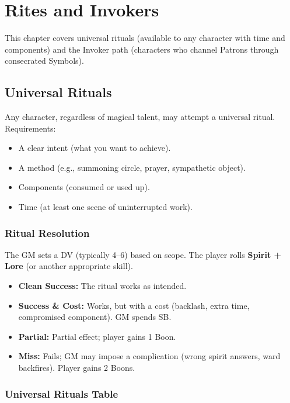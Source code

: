 
\section{Rites and Invokers}

This chapter covers universal rituals (available to any character with time and components) and the Invoker path (characters who channel Patrons through consecrated Symbols).

\subsection{Universal Rituals}

Any character, regardless of magical talent, may attempt a universal ritual. Requirements:

\begin{itemize}
  \item A clear intent (what you want to achieve).
  \item A method (e.g., summoning circle, prayer, sympathetic object).
  \item Components (consumed or used up).
  \item Time (at least one scene of uninterrupted work).
\end{itemize}

\subsubsection{Ritual Resolution}
The GM sets a DV (typically 4--6) based on scope. The player rolls \textbf{Spirit + Lore} (or another appropriate skill).

\begin{itemize}
  \item \textbf{Clean Success:} The ritual works as intended.
  \item \textbf{Success \& Cost:} Works, but with a cost (backlash, extra time, compromised component). GM spends SB.
  \item \textbf{Partial:} Partial effect; player gains 1 Boon.
  \item \textbf{Miss:} Fails; GM may impose a complication (wrong spirit answers, ward backfires). Player gains 2 Boons.
\end{itemize}

\subsubsection{Universal Rituals Table}

